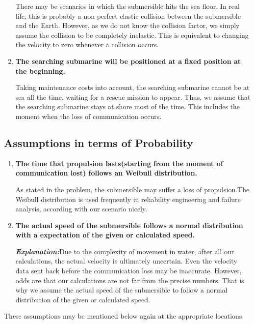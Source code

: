 \documentclass[12pt]{article}
\begin{document}
\begin{enumerate}
	There may be scenarios in which the submersible hits the sea floor. In real life, this is probably a non-perfect elastic collision between the submersible and the Earth. However, as we do not know the collision factor, we simply assume the collision to be completely inelastic. This is equivalent to changing the velocity to zero whenever a collision occurs.
	\item \textbf{The searching submarine will be positioned at a fixed position at the beginning.}
 
	Taking maintenance costs into account, the searching submarine cannot be at sea all the time, waiting for a rescue mission to appear. Thus, we assume that the searching submarine stays at shore most of the time. This includes the moment when the loss of communication occurs.
\end{enumerate}
\subsection{Assumptions in terms of Probability}
\begin{enumerate}
	\item \textbf{The time that propulsion lasts(starting from the moment of communication lost) follows an Weibull distribution.}
 
	As stated in the problem, the submersible may suffer a loss of propulsion.The Weibull distribution is used frequently in reliability engineering and failure analysis, according with our scenario nicely.
	\item \textbf{The actual speed of the submersible follows a normal distribution with a expectation of the given or calculated speed.}
 
	\textbf{\textit{Explanation:}}Due to the complexity of movement in water, after all our calculations, the actual velocity is ultimately uncertain. Even the velocity data sent back before the communication loss may be inaccurate. However, odds are that our calculations are not far from the precise numbers. That is why we assume the actual speed of the submersible to follow a normal distribution of the given or calculated speed.
\end{enumerate}
These assumptions may be mentioned below again at the appropriate locations. 
\end{document}
